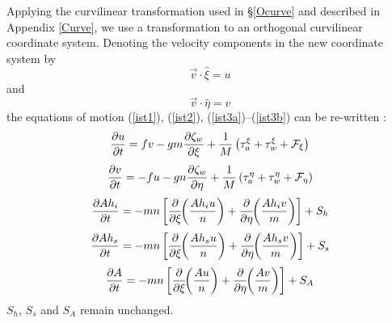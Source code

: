 Applying the curvilinear transformation used in \S\ref{Ocurve} and
described in Appendix \ref{Curve}, we use a transformation to an
orthogonal curvilinear coordinate system.  Denoting the velocity
components in the new coordinate system by
\begin{equation}
   \vec{v} \cdot \hat{\xi} = u
\end{equation}
and
\begin{equation}
   \vec{v} \cdot \hat{\eta} = v
\end{equation}
the equations of motion (\ref{ist1}), (\ref{ist2}),
(\ref{ist3a})--(\ref{ist3b}) can be re-written
\citep[see, e.g.,][]{AL}:
{\samepage
\begin{equation}
   {\partial u \over \partial t} = fv
   - gm {\partial \zeta_w \over \partial \xi} +
   {1 \over M} \left( \tau_a^{\xi} + \tau_w^{\xi} + {\cal F}_{\xi}
   \right)
\label{ist13}
\end{equation}
}
\vspace{.2cm}
{\samepage
\begin{equation}
   {\partial v \over \partial t} = - fu
   - gn {\partial \zeta_w \over \partial \eta} +
   {1 \over M} \left( \tau_a^{\eta} + \tau_w^{\eta} + {\cal F}_{\eta}
   \right)
\label{ist14}
\end{equation}
}
\begin{equation}
   {\partial A h_i \over \partial t} =
   - mn \left[ {\partial \over \partial \xi} \!\!
   \left( {A h_i u \over n}
   \right ) + {\partial \over \partial \eta} \!\!
   \left( {A h_i v \over m}
   \right) \right] + S_h
\label{ist15}
\end{equation}
\begin{equation}
   {\partial A h_s \over \partial t} =
   - mn \left[ {\partial \over \partial \xi} \!\!
   \left( {A h_s u \over n}
   \right ) + {\partial \over \partial \eta} \!\!
   \left( {A h_s v \over m}
   \right) \right] + S_s
\label{ist15a}
\end{equation}
\begin{equation}
   {\partial A \over \partial t} =
   - mn \left[ {\partial \over \partial \xi} \!\! \left( {Au \over n}
   \right ) + {\partial \over \partial \eta} \!\! \left( {Av \over m}
   \right) \right] + S_A
\label{ist16}
\end{equation}
\vspace{.2cm}
$S_h$, $S_s$ and $S_A$ remain unchanged.

